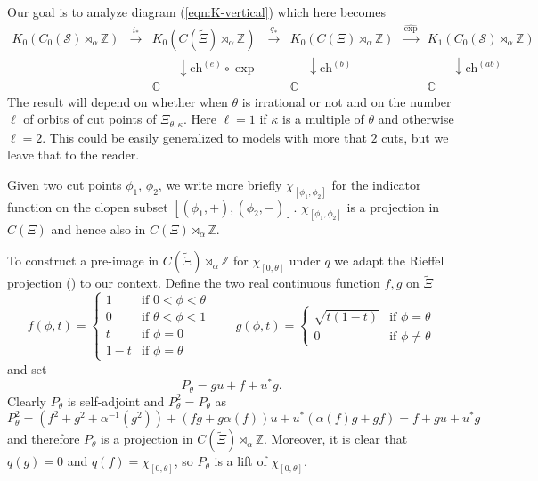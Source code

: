 \documentclass[11pt]{amsart}
\newcommand{\Z}{\mathbb{Z}}
\newcommand{\C}{\mathbb{C}}
\newcommand{\cut}{\kappa}
\newcommand{\chb}{\text{ch}^{(b)}}
\newcommand{\che}{\text{ch}^{(e)}}
\newcommand{\chab}{\text{ch}^{(ab)}}
\newcommand{\Ss}{\mathcal{S}}
\begin{document}
Our goal is to analyze diagram (\ref{eqn:K-vertical}) which here becomes
\begin{equation}\label{eqn:K-vertical-cut}
\begin{matrix}
K_0(C_0(\Ss) \rtimes_\alpha \mathbb{Z}) & \stackrel{i_*}\to &
 K_0(C(\tilde \Xi) \rtimes_\alpha \mathbb{Z}) &  \stackrel{q_*}\to &
K_0(C(\Xi) \rtimes_\alpha \mathbb{Z}) &  \stackrel{\hat\exp}\to & 
K_1(C_0(\Ss) \rtimes_\alpha \mathbb{Z})\\
 & &\:\:\:\:\:\:\:\:\: \downarrow \che\!\circ\exp & &\:\:\:\:\:\: \downarrow \chb & &\:\:\:\:\:\:\:\:\: \downarrow \chab  \\
 & &\!\!\!\!\!\!\!\!\!\!\!\!\!\!\!\!\!\!\!\!\!\C  & & \!\!\!\!\!\!\!\!\!\!\!\!\!\C  & & \!\!\!\!\!\!\!\!\!\!\!\!\C
\end{matrix}
\end{equation}
The result will depend on whether when $\theta$ is irrational or not and on the number $\ell$ of orbits of cut points of $\Xi_{\theta,\cut}$. 
Here $\ell=1$ if $\cut$ is a multiple of $\theta$ and otherwise $\ell=2$. 
This could be easily generalized to models with more that $2$ cuts, but we leave that to the reader. 


Given two cut points $\phi_1$, $\phi_2$,
we write more briefly $\chi_{[\phi_1,\phi_2]}$ for 
the indicator function on the clopen subset $[(\phi_1,+),(\phi_2,-)]$. 
$\chi_{[\phi_1,\phi_2]}$ is a projection in $C(\Xi)$ and hence also in
$C(\Xi)\rtimes_\alpha\Z$.

To construct a pre-image in $C(\tilde\Xi)\rtimes_\alpha\Z$ for $\chi_{[0, \theta]}$ under $q$ we adapt the Rieffel projection (\cite{rieffel1981c}) to our context. Define the two real continuous function $f,g$ on $\tilde{\Xi}$
\begin{equation}\label{eq-Rieffel}
f(\phi,t) = \left\{\begin{array}{ll}
1 & \mbox{if } 0<\phi<\theta \\
0 & \mbox{if } \theta<\phi<1 \\
t & \mbox{if } \phi = 0 \\
1-t & \mbox{if } \phi = \theta 
\end{array}\right.
\qquad
g(\phi,t) = \left\{\begin{array}{ll}
\sqrt{t(1-t)} & \mbox{if } \phi =\theta \\
0 & \mbox{if } \phi\neq \theta 
\end{array}\right.
\end{equation}
and set 
		$$P_\theta = gu+f +u^* g.$$
		Clearly $P_\theta$ is self-adjoint and $P_\theta^2=P_\theta$ as
		$$P_\theta^2=(f^2+g^2+\alpha^{-1}(g^2))+(fg+g\alpha(f))u+u^*(\alpha(f)g+gf)=f+gu+u^*g$$
		and therefore $P_\theta$ is a projection in $C(\tilde{\Xi})\rtimes_\alpha\Z$. Moreover, it is clear that $q(g) = 0$ and $q(f ) = \chi_{[0 ,\theta]}$, so $P_\theta$ is a lift of $\chi_{[0 ,\theta]}$.
\end{document}
